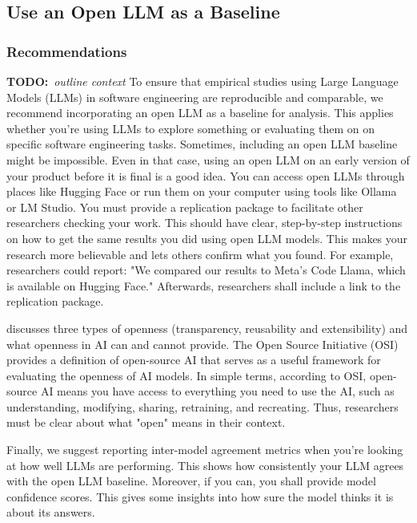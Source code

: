 \documentclass[11pt]{article}
\newcommand{\todo}[1]{{\textbf{TODO:}\ \textit{#1}}} %
\begin{document}
\subsection{Use an Open LLM as a Baseline}

\subsubsection{Recommendations}

\todo{outline context}
To ensure that empirical studies using Large Language Models (LLMs) in software engineering are reproducible and comparable, we recommend incorporating an open LLM as a baseline for analysis. This applies whether you're using LLMs to explore something or evaluating them on on specific software engineering tasks. 
Sometimes, including an open LLM baseline might be impossible. Even in that case, using an open LLM on an early version of your product before it is final is a good idea.
You can access open LLMs through places like Hugging Face or run them on your computer using tools like Ollama or LM Studio. 
You must provide a replication package to facilitate other researchers checking your work. This should have clear, step-by-step instructions on how to get the same results you did using open LLM models. This makes your research more believable and lets others confirm what you found. For example, researchers could report: "We compared our results to Meta's Code Llama, which is available on Hugging Face." Afterwards, researchers shall include a link to the replication package.

\citet{widder2024open} discusses three types of openness (transparency, reusability and extensibility) and  what openness in AI can and cannot provide. The Open Source Initiative (OSI) \cite{OSIAI2024} provides a definition of open-source AI that serves as a useful framework for evaluating the openness of AI models. In simple terms, according to OSI, open-source AI means you have access to everything you need to use the AI, such as understanding, modifying, sharing, retraining, and recreating. Thus, researchers must be clear about what "open" means in their context.

Finally, we suggest reporting inter-model agreement metrics when you're looking at how well LLMs are performing. This shows how consistently your LLM agrees with the open LLM baseline. Moreover, if you can, you shall provide model confidence scores. This gives some insights into how sure the model thinks it is about its answers. 
\end{document}

